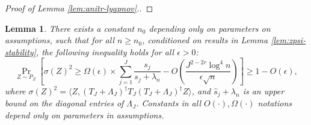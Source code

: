 \documentclass[11pt,a4paper]{article}
\renewcommand{\hat}{\widehat}
\theoremstyle{definition}
\theoremstyle{plain}
\newtheorem{lemma}{Lemma}[section]
\theoremstyle{remark}
\newcommand{\ud}{\mathrm d}
\begin{document}
\begin{proof}[Proof of Lemma \ref{lem:anitr-lyapnov}.]
\end{proof}

{\color{orange}
\begin{lemma}
There exists a constant $n_0$ depending only on parameters on assumptions, such that for all $n\geq n_0$,
conditioned on results in Lemma \ref{lem:zpsi-stability}, the following inequality holds for all $\epsilon>0$:
$$
\Pr_{Z\sim P_Z}\left[\sigma(Z)^2 \geq \Omega(\epsilon)\times \sum_{j=1}^J \frac{s_j}{s_j+\lambda_n} - O\left(\frac{J^{2-2r}\log^4 n}{\epsilon \sqrt{n}}\right)\right]\geq 1-O(\epsilon),
$$
where $\sigma(Z)^2 = \langle Z, (T_J+\Lambda_J)^\dagger T_J(T_J+\Lambda_J)^\dagger Z\rangle$, and $\hat s_j+\lambda_n$ is an upper bound on the diagonal entries of $\Lambda_J$.
Constants in all $O(\cdot),\Omega(\cdot)$ notations depend only on parameters in assumptions.
\label{lem:variance-stability}
\end{lemma}
}
\end{document}
